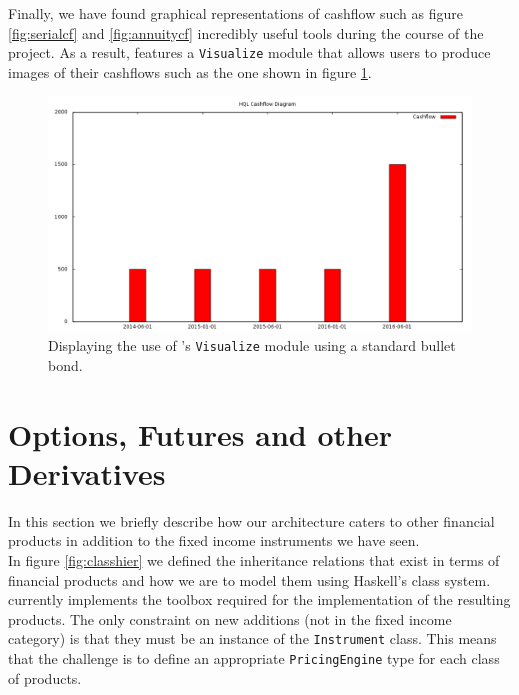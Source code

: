 \vspace{0.3cm}

Finally, we have found graphical representations of cashflow such as figure
\ref{fig:serialcf} and \ref{fig:annuitycf} incredibly useful tools during
the course of the project. As a result, \hql features a \texttt{Visualize}
module that allows users to produce images of their cashflows such as the 
one shown in figure \ref{fig:awesomeness}.

\begin{figure}[h!]
\begin{center}
\includegraphics[keepaspectratio=true,scale=0.4]{images/GraphicsModuleAwesome.png}
\caption{Displaying the use of \hql's \texttt{Visualize} module using a standard bullet bond.}
\label{fig:awesomeness}
\end{center}
\end{figure}


\section{Options, Futures and other Derivatives}

In this section we briefly describe how our architecture caters to other
financial products in addition to the fixed income instruments we have seen.\\

In figure \ref{fig:classhier} we defined the inheritance relations that
exist in terms of financial products and how we are to model them using 
Haskell's class system. \hql currently implements the toolbox required
for the implementation of the resulting products. The only constraint on
new additions (not in the fixed income category) is that they must be an
instance of the \texttt{Instrument} class. This means that the challenge
is to define an appropriate \texttt{PricingEngine}
type for each class of products.\\

